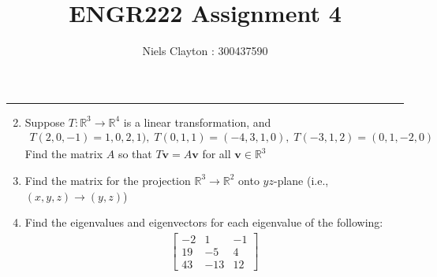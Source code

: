 \documentclass[a4paper,11pt]{article}
\title{\LARGE{\textbf{ENGR222 Assignment 4}}}
\author{Niels Clayton : 300437590}
\date{}
\begin{document}
\begin{preview}
    \maketitle
    \hrule

    
    \begin{enumerate}
        \setcounter{enumi}{1}
        \item Suppose $T : \mathbb{R}^3 \rightarrow \mathbb{R}^4$ is a linear transformation, and
        \begin{align*}
              T(2, 0,-1) = 1, 0,2, 1),\;
              T(0, 1,1) = (-4, 3,1, 0),\;
              T(-3, 1,2) = (0, 1,-2, 0)
        \end{align*}
        Find the matrix $A$ so that $T\textbf{v}=A\textbf{v}$ for all $\textbf{v} \in \mathbb{R}^3$


        \item Find the matrix for the projection $\mathbb{R}^3 \rightarrow \mathbb{R}^2$ onto $yz$-plane (i.e., $(x,y,z) \rightarrow (y,z)$)
        

        \item Find the eigenvalues and eigenvectors for each eigenvalue of the following: 
        \begin{align*}
              \begin{bmatrix}-2&1&-1\\ 19&-5&4\\ 43&-13&12\end{bmatrix}
        \end{align*}



        
  \end{enumerate}

\end{preview}
\end{document}
